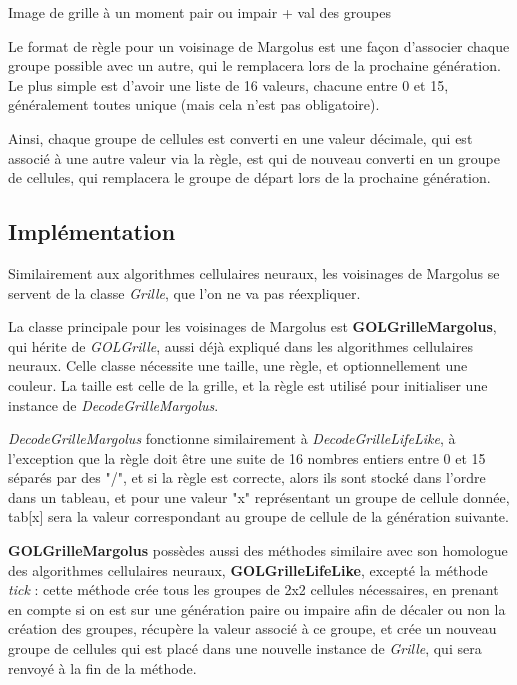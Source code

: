 Image de grille à un moment pair ou impair + val des groupes


\par Le format de règle pour un voisinage de Margolus est une façon d'associer chaque groupe possible avec un autre, qui le remplacera lors de la prochaine génération. Le plus simple est d'avoir une liste de 16 valeurs, chacune entre 0 et 15, généralement toutes unique (mais cela n'est pas obligatoire). 

\par Ainsi, chaque groupe de cellules est converti en une valeur décimale, qui est associé à une autre valeur via la règle, est qui de nouveau converti en un groupe de cellules, qui remplacera le groupe de départ lors de la prochaine génération.

\subsection{Implémentation}

\par Similairement aux algorithmes cellulaires neuraux, les voisinages de Margolus se servent de la classe \textit{Grille}, que l'on ne va pas réexpliquer.

\par La classe principale pour les voisinages de Margolus est \textbf{GOLGrilleMargolus}, qui hérite de \textit{GOLGrille}, aussi déjà expliqué dans les algorithmes cellulaires neuraux. Celle classe nécessite une taille, une règle, et optionnellement une couleur. La taille est celle de la grille, et la règle est utilisé pour initialiser une instance de \textit{DecodeGrilleMargolus}.

\par \textit{DecodeGrilleMargolus} fonctionne similairement à \textit{DecodeGrilleLifeLike}, à l'exception que la règle doit être une suite de 16 nombres entiers entre 0 et 15 séparés par des "/", et si la règle est correcte, alors ils sont stocké dans l'ordre dans un tableau, et pour une valeur "x" représentant un groupe de cellule donnée, tab[x] sera la valeur correspondant au groupe de cellule de la génération suivante.

\par \textbf{GOLGrilleMargolus} possèdes aussi des méthodes similaire avec son homologue des algorithmes cellulaires neuraux, \textbf{GOLGrilleLifeLike}, excepté la méthode \textit{tick} : cette méthode crée tous les groupes de 2x2 cellules nécessaires, en prenant en compte si on est sur une génération paire ou impaire afin de décaler ou non la création des groupes, récupère la valeur associé à ce groupe, et crée un nouveau groupe de cellules qui est placé dans une nouvelle instance de \textit{Grille}, qui sera renvoyé à la fin de la méthode.

